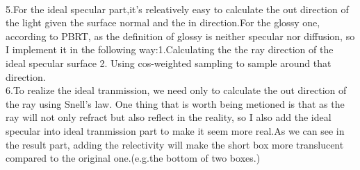 \documentclass[acmtog]{acmart}
\begin{document}
\\\indent 5.For the ideal specular part,it's releatively easy to calculate the out direction of the light given the surface normal and the in direction.For the glossy one, according to PBRT, as the definition of glossy is neither specular nor diffusion, so I implement it in the following way:1.Calculating the the ray direction of the ideal specular surface 2. Using cos-weighted sampling to sample around that direction.
\\\indent 6.To realize the ideal tranmission, we need only to calculate the out direction of the ray using Snell's law. One thing that is worth being metioned is that as the ray will not only refract but also reflect in the reality, so I also add the ideal specular into ideal tranmission part to make it seem more real.As we can see in the result part, adding the relectivity will make the short box more translucent compared to the original one.(e.g.the bottom of two boxes.)
\end{document}
